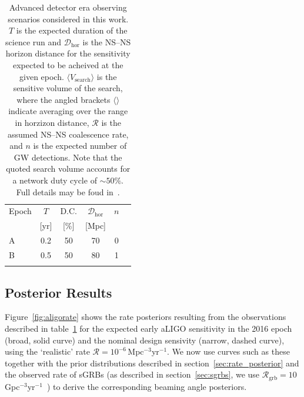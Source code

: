 \documentclass[twocolumn,nofootinbib]{revtex4-1}
\newcommand{\grbrate}{{{\mathcal R}_{\mathrm{grb}}}}
\newcommand{\cbcrate}{{{\mathcal R}}}
\newcommand{\dhor}{{\mathcal D}_{\mathrm{hor}}}
\newcommand{\BNS}{\ac{NS}--\ac{NS}\xspace}
\begin{document}
%
\begin{table}
\centering
\begin{tabular}{l c c c c c }
  \toprule
  Epoch & $T$ & D.C. & $\dhor$ & $n$ \\
        & [yr]& [\%] & [Mpc]   &     \\
  \colrule
  A     & 0.2 & 50   & 70      & 0 \\
  B     & 0.5 & 50   & 80      & 1 \\%
\botrule
\end{tabular}
\caption{Advanced detector era observing scenarios considered in this work.
    $T$ is the expected duration of the science run and $\dhor$ is the \BNS horizon distance for the sensitivity expected to be acheived at the given epoch.
$\langle V_{\mathrm{search}}\rangle $ is the sensitive volume of the search, where the angled brackets $\langle \rangle$ indicate averaging over the range in horzizon distance, $\cbcrate$ is the assumed \BNS coalescence rate, and $n$ is the expected number of \ac{GW} detections.
    Note that the quoted search volume accounts for a network duty cycle of $\sim 50\%$.
    Full details may be foud in~\cite{Aasi:2013wya}.
    \label{table:scenarios}}
\end{table}
%

\subsection{Posterior Results}
Figure~\ref{fig:aligorate} shows the rate posteriors resulting from the observations described in table~\ref{table:scenarios} for the expected early \ac{aLIGO} sensitivity in the 2016 epoch (broad, solid curve) and the nominal design sensivity (narrow, dashed curve), using the `realistic' rate $\cbcrate=10^{-6}$\,Mpc$^{-3}$yr$^{-1}$.
We now use curves such as these together with the prior distributions described in section~\ref{sec:rate_posterior} and the observed rate of \acp{sGRB} (as described in section~\ref{sec:sgrbs}, we use $\grbrate=10$\,Gpc$^{-3}$yr$^{-1}$~\cite{Nakar:2007yr,Dietz:2010eh}) to derive the corresponding beaming angle posteriors.
\end{document}
